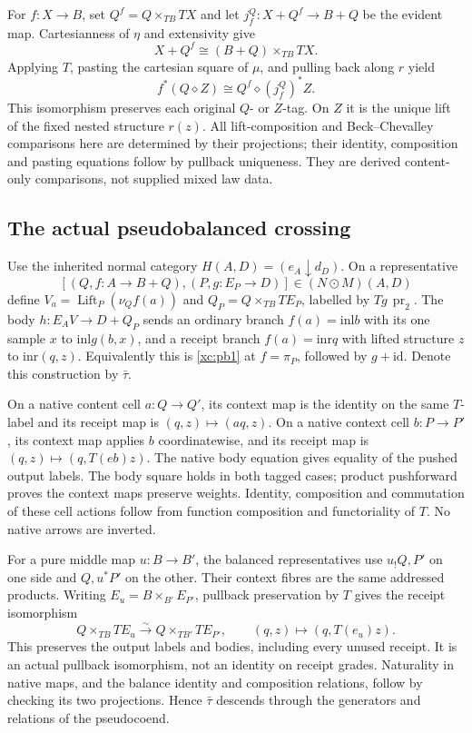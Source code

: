 \documentclass[11pt,a4paper]{article}
\theoremstyle{definition}
\newcommand{\id}{\mathrm{id}}
\newcommand{\inl}{\mathrm{inl}}
\newcommand{\inr}{\mathrm{inr}}
\begin{document}
For $f:X\to B$, set $Q^f=Q\times_{TB}TX$ and let
$j_f^Q:X+Q^f\to B+Q$ be the evident map. Cartesianness of $\eta$ and
extensivity give
\begin{equation}\label{xc:pb1}
 X+Q^f\cong(B+Q)\times_{TB}TX.
\end{equation}
Applying $T$, pasting the cartesian square of $\mu$, and pulling back along
$r$ yield
\begin{equation}\label{xc:pb2}
 f^*(Q\diamond Z)\cong Q^f\diamond(j_f^Q)^*Z.
\end{equation}
This isomorphism preserves each original $Q$- or $Z$-tag. On $Z$ it is
the unique lift of the fixed nested structure $r(z)$. All lift-composition
and Beck--Chevalley comparisons here are determined by their projections;
their identity, composition and pasting equations follow by pullback
uniqueness. They are derived content-only comparisons, not supplied mixed
law data.

\subsection{The actual pseudobalanced crossing}

Use the inherited normal category $H(A,D)=(e_A\downarrow d_D)$.
On a representative
\[
 [(Q,f:A\to B+Q),(P,g:E_P\to D)]\in(N\odot M)(A,D)
\]
define $V_a=\operatorname{Lift}_P(\nu_Qf(a))$ and
$Q_P=Q\times_{TB}TE_P$, labelled by $Tg\,\operatorname{pr}_2$.
The body $h:E_AV\to D+Q_P$ sends an ordinary branch
$f(a)=\inl b$ with its one sample $x$ to $\inl g(b,x)$, and a receipt
branch $f(a)=\inr q$ with lifted structure $z$ to $\inr(q,z)$.
Equivalently this is \eqref{xc:pb1} at $f=\pi_P$, followed by
$g+\id$. Denote this construction by $\bar\tau$.

On a native content cell $a:Q\to Q'$, its context map is the identity
on the same $T$-label and its receipt map is $(q,z)\mapsto(aq,z)$.
On a native context cell $b:P\to P'$, its context map applies $b$
coordinatewise, and its receipt map is
$(q,z)\mapsto(q,T(eb)z)$. The native body equation gives equality of
the pushed output labels. The body square holds in both tagged cases;
product pushforward proves the context maps preserve weights. Identity,
composition and commutation of these cell actions follow from function
composition and functoriality of $T$. No native arrows are inverted.

For a pure middle map $u:B\to B'$, the balanced representatives use
$u_!Q,P'$ on one side and $Q,u^*P'$ on the other. Their context fibres
are the same addressed products. Writing $E_u=B\times_{B'}E_{P'}$,
pullback preservation by $T$ gives the receipt isomorphism
\begin{equation}\label{xc:balance}
 Q\times_{TB}TE_u\xrightarrow{\sim}Q\times_{TB'}TE_{P'},
 \qquad(q,z)\longmapsto(q,T(e_u)z).
\end{equation}
This preserves the output labels and bodies, including every unused
receipt. It is an actual pullback isomorphism, not an identity on receipt
grades. Naturality in native maps, and the balance identity and composition
relations, follow by checking its two projections. Hence $\bar\tau$
descends through the generators and relations of the pseudocoend.
\end{document}
